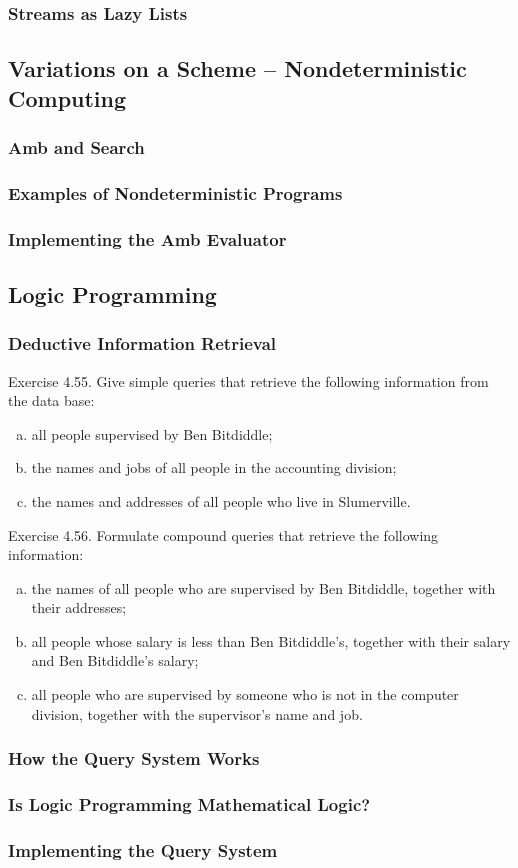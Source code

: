             \subsubsection{Streams as Lazy Lists}
        \subsection{Variations on a Scheme -- Nondeterministic Computing}
            \subsubsection{Amb and Search}
            \subsubsection{Examples of Nondeterministic Programs}
            \subsubsection{Implementing the Amb Evaluator}
        \subsection{Logic Programming}
            \subsubsection{Deductive Information Retrieval}
Exercise 4.55.  Give simple queries that retrieve the following information from the data base:
\begin{enumerate}[(a)]
\item all people supervised by Ben Bitdiddle;
\item the names and jobs of all people in the accounting division;
\item the names and addresses of all people who live in Slumerville.
\end{enumerate}
Exercise 4.56.  Formulate compound queries that retrieve the following information:
\begin{enumerate}[(a)]
\item the names of all people who are supervised by Ben Bitdiddle, together with their addresses;
\item all people whose salary is less than Ben Bitdiddle's, together with their salary and Ben Bitdiddle's salary;
\item all people who are supervised by someone who is not in the computer division, together with the supervisor's name and job.
\end{enumerate}
            \subsubsection{How the Query System Works}
            \subsubsection{Is Logic Programming Mathematical Logic?}
            \subsubsection{Implementing the Query System}

